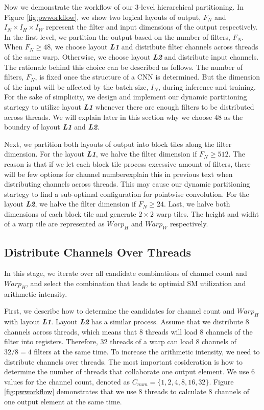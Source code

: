 Now we demonstrate the workflow of our 3-level hierarchical partitioning.
In Figure \ref{fig:pwworkflow}, we show two logical layouts of output, $F_N$ and $I_N \times I_H \times I_W$ represent the filter and input dimensions of the output respectively.
In the first level, we partition the output based on the number of filters, $F_N$.
When $F_N \ge 48$, we choose layout \textbf{\emph{L1}} and distribute filter channels across threads of the same warp. 
Otherwise, we choose layout \textbf{\emph{L2}} and distribute input channels.
The rationale behind this choice can be described as follows. 
The number of filters, $F_N$, is fixed once the structure of a CNN is determined. 
But the dimension of the input will be affected by the batch size, $I_N$, during inference and training.
For the sake of simplicity, we design and implement our dynamic partitioning startegy to utilize layout \textbf{\emph{L1}} whenever there are enough filters to be distributed across threads.
We will explain later in this section why we choose 48 as the boundry of layout \textbf{\emph{L1}} and \textbf{\emph{L2}}.

Next, we partition both layouts of output into block tiles along the filter dimension. 
For the layout \textbf{\emph{L1}}, we halve the filter dimension if $F_N \geq 512$. 
The reason is that if we let each block tile process excessive amount of filters, there will be few options for channel number{\color{red}explain this in previous text} when distributing channels across threads. 
This may cause our dynamic partitioning startegy to find a sub-optimal configuration for pointwise convolution.
For the layout \textbf{\emph{L2}}, we halve the filter dimension if $F_N \geq 24$.
Last, we halve both dimensions of each block tile and generate $2 \times 2$ warp tiles. The height and widht of a warp tile are represented as $Warp_H$ and $Warp_W$ respectively.

\subsection{Distribute Channels Over Threads}
In this stage, we iterate over all candidate combinations of channel count and $Warp_H$, and select the combination that leads to optimial SM utilization and arithmetic intensity.

First, we describe how to determine the candidates for channel count and $Warp_H$ with layout \textbf{\emph{L1}}. Layout \textbf{\emph{L2}} has a similar process.
Assume that we distribute 8 channels across threads, which means that 8 threads will load 8 channels of the filter into registers. 
Therefore, 32 threads of a warp can load 8 channels of $32/8=4$ filters  at the same time.
To increase the arithmetic intensity, we need to distribute channels over threads. The most important cosideration is how to determine the number of threads that collaborate one output element. We use 6 values for the channel count, denoted as $C_{num}=\{1,2,4,8,16,32\}$. 
Figure \ref{fig:pwworkflow} demonstrates that we use 8 threads to calculate 8 channels of one output element at the same time. 

